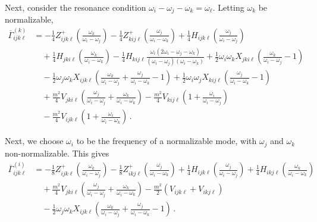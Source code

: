 \documentclass[letterpaper,11pt]{article}
\newcommand{\oi}{\omega_i}
\newcommand{\oj}{\omega_j}
\newcommand{\ok}{\omega_k}
\newcommand{\ol}{\omega_\ell}
\begin{document}
Next, consider the resonance condition $\oi - \oj - \ok = \ol$. Letting $\ok$ be normalizable,
\begin{align}
\overline{\Gamma}^{(k)}_{ijk\ell} &= - \frac{1}{4} Z^{+}_{ijk\ell} \left( \frac{\ok}{\oi - \oj} \right) - \frac{1}{4} Z^{+}_{kij\ell} \left( \frac{\oj}{\oi - \ok} \right) + \frac{1}{4} H_{ijk\ell} \left(\frac{\oj}{\oi - \oj} \right) \nonumber \\
%
& \quad + \frac{1}{4} H_{jki\ell} \left(\frac{\ok}{\oi - \ok} \right) - \frac{1}{4} H_{kij\ell} \frac{\oi (2\oi - \oj - \ok)}{(\oi - \oj)(\oi - \ok)} + \frac{1}{2} \oi \ok X_{jki\ell} \left( \frac{\ok}{\oi - \oj} - 1 \right) \nonumber \\
%
& \quad  - \frac{1}{2} \oj \ok X_{ijk\ell} \left( \frac{\ok}{\oi - \oj} + \frac{\oj}{\oi - \ok} - 1 \right) + \frac{1}{2} \oi \oj X_{kij\ell} \left( \frac{\oj}{\oi - \ok} - 1 \right) \nonumber \\
%
& \quad + \frac{m^2}{4} V_{jki\ell} \left( \frac{\oj}{\oi - \oj} + \frac{\ok}{\oi - \ok} \right) - \frac{m^2}{4} V_{kij\ell} \left( 1 + \frac{\oi}{\oi - \oj} \right) \nonumber \\
%
& \quad - \frac{m^2}{4} V_{ijk\ell} \left( 1 + \frac{\oi}{\oi - \ok} \right) \, .
\end{align}

Next, we choose $\oi$ to be the frequency of a normalizable mode, with $\oj$ and $\ok$ non-normalizable. This gives
\begin{align}
\overline{\Gamma}^{(i)}_{ijk\ell} &= -\frac{1}{8} Z^+_{ijk\ell} \left( \frac{\ok}{\oi - \oj} \right) - \frac{1}{8} Z^+_{ikj\ell} \left( \frac{\oj}{\oi - \ok} \right) + \frac{1}{4} H_{ijk\ell} \left( \frac{\oj}{\oi - \oj} \right) + \frac{1}{4} H_{ikj\ell} \left( \frac{\ok}{\oi - \ok} \right) \nonumber \\
%
& \quad + \frac{m^2}{4}V_{jki\ell} \left( \frac{\oj}{\oi - \oj} + \frac{\ok}{\oi - \ok} \right) - \frac{m^2}{2} \left( V_{ijk\ell} + V_{ikj\ell} \right) \nonumber \\
%
& \quad - \frac{1}{2} \oj \ok X_{ijk\ell} \left( \frac{\ok}{\oi - \oj} + \frac{\oj}{\oi - \ok} - 1 \right) \, .
\end{align}
\end{document}
